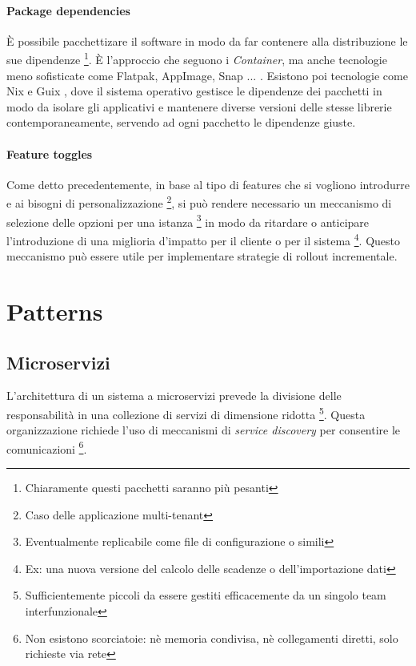 \documentclass[a4paper,11pt,oneside, table]{article}
\begin{document}
  \paragraph{Package dependencies}

  \`E possibile pacchettizare il software in modo da far contenere alla distribuzione le sue dipendenze \footnote{Chiaramente questi pacchetti saranno pi\`u pesanti}. \`E l'approccio che seguono i \textit{Container}, ma anche tecnologie meno sofisticate come Flatpak, AppImage, Snap ... \cite{cichocki2023comparative}. Esistono poi tecnologie come Nix \cite{dolstra2004nix} e Guix \cite{courtes2013functional}, dove il sistema operativo gestisce le dipendenze dei pacchetti in modo da isolare gli applicativi e mantenere diverse versioni delle stesse librerie contemporaneamente, servendo ad ogni pacchetto le dipendenze giuste.

  \paragraph{Feature toggles}

  Come detto precedentemente, in base al tipo di features che si vogliono introdurre e ai bisogni di personalizzazione \footnote{Caso delle applicazione multi-tenant}, si pu\`o rendere necessario un meccanismo di selezione delle opzioni per una istanza \footnote{Eventualmente replicabile come file di configurazione o simili} in modo da ritardare o anticipare l'introduzione di una miglioria d'impatto per il cliente o per il sistema \footnote{Ex: una nuova versione del calcolo delle scadenze o dell'importazione dati}. Questo meccanismo pu\`o essere utile per implementare strategie di rollout incrementale.

  \section{Patterns}

  \subsection{Microservizi}

  L'architettura di un sistema a microservizi prevede la divisione delle responsabilit\`a in una collezione di servizi di dimensione ridotta \footnote{Sufficientemente piccoli da essere gestiti efficacemente da un singolo team interfunzionale}. Questa organizzazione richiede l'uso di meccanismi di \textit{service discovery} per consentire le comunicazioni \footnote{Non esistono scorciatoie: n\`e memoria condivisa, n\`e collegamenti diretti, solo richieste via rete}.
\end{document}
